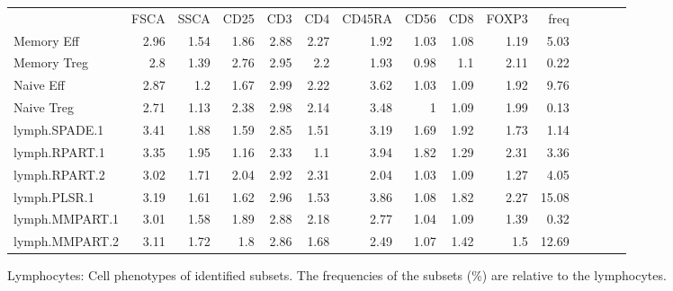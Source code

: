 \begin{table}[h]\footnotesize
\centering
\begin{tabular}{lrrrrrrrrrrrrrr}
\rowcolor{Gray}
            & FSCA & SSCA & CD25 & CD3  & CD4  & CD45RA & CD56 & CD8  & FOXP3 & freq \\
Memory Eff  & 2.96 & 1.54 & 1.86 & 2.88 & 2.27 & 1.92 & 1.03 & 1.08 & 1.19 & 5.03 \\
Memory Treg & 2.8  & 1.39 & 2.76 & 2.95 & 2.2  & 1.93 & 0.98 & 1.1  & 2.11 & 0.22 \\
Naive Eff   & 2.87 & 1.2  & 1.67 & 2.99 & 2.22 & 3.62 & 1.03 & 1.09 & 1.92 & 9.76 \\
Naive Treg  & 2.71 & 1.13 & 2.38 & 2.98 & 2.14 & 3.48 & 1    & 1.09 & 1.99 & 0.13 \\
\hline
lymph.SPADE.1     & 3.41 & 1.88 & 1.59 & 2.85 & 1.51 & 3.19 & 1.69 & 1.92 & 1.73 & 1.14 \\
lymph.RPART.1     & 3.35 & 1.95 & 1.16 & 2.33 & 1.1  & 3.94 & 1.82 & 1.29 & 2.31 & 3.36 \\
lymph.RPART.2     & 3.02 & 1.71 & 2.04 & 2.92 & 2.31 & 2.04 & 1.03 & 1.09 & 1.27 & 4.05 \\
lymph.PLSR.1      & 3.19 & 1.61 & 1.62 & 2.96 & 1.53 & 3.86 & 1.08 & 1.82 & 2.27 & 15.08 \\
lymph.MMPART.1    & 3.01 & 1.58 & 1.89 & 2.88 & 2.18 & 2.77 & 1.04 & 1.09 & 1.39 & 0.32 \\
lymph.MMPART.2    & 3.11 & 1.72 & 1.8  & 2.86 & 1.68 & 2.49 & 1.07 & 1.42 & 1.5  & 12.69 \\
\end{tabular}
{ Lymphocytes: Cell phenotypes of identified subsets. }
{ The frequencies of the subsets (\%) are relative to the lymphocytes. }
\end{table}


